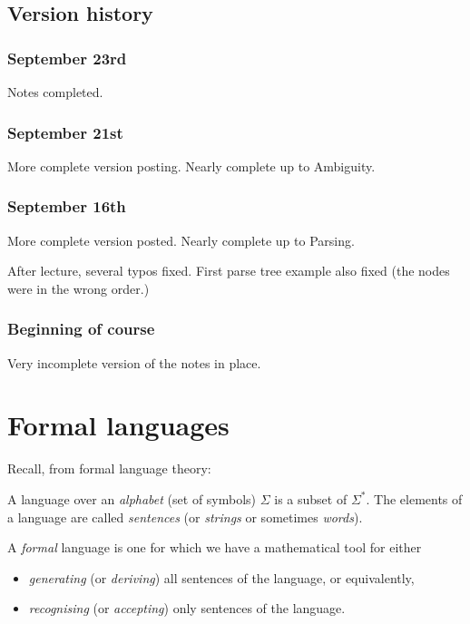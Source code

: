 \documentclass[11pt]{article}
\theoremstyle{definition}
\begin{document}
\subsection{Version history}
\label{sec:orgbf1b67c}
\subsubsection{September 23rd}
\label{sec:orge322146}

Notes completed.

\subsubsection{September 21st}
\label{sec:orgc7aa726}

More complete version posting. Nearly complete up to
Ambiguity.

\subsubsection{September 16th}
\label{sec:org4c813c1}
More complete version posted. Nearly complete up to Parsing.

After lecture, several typos fixed.
First parse tree example also fixed
(the nodes were in the wrong order.)

\subsubsection{Beginning of course}
\label{sec:org96611cc}
Very incomplete version of the notes in place.

\section{Formal languages}
\label{sec:org1abba4f}
Recall, from formal language theory:

A language over an \emph{alphabet} (set of symbols) \(Σ\)
is a subset of \(Σ^{*}\).
The elements of a language are called \emph{sentences}
(or \emph{strings} or sometimes \emph{words}).

A \emph{formal} language is one for which we have a mathematical tool
for either
\begin{itemize}
\item \emph{generating} (or \emph{deriving}) all sentences of the language,
or equivalently,
\item \emph{recognising} (or \emph{accepting}) only sentences of the language.
\end{itemize}
\end{document}
